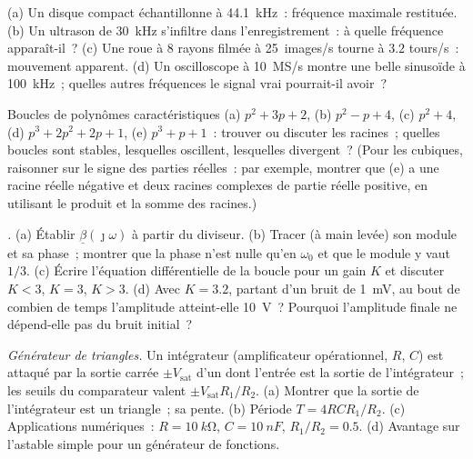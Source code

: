 \begin{exercise}[$\star$]\label{exo:b2:feedback-oscillators:4}
(a) Un disque compact échantillonne à \qty{44.1}{kHz}~: fréquence maximale restituée. (b) Un
ultrason de \qty{30}{kHz} s'infiltre dans l'enregistrement~: à quelle fréquence
apparaît-il~? (c) Une roue à $8$ rayons filmée à \qty{25}{images/s} tourne
à $3.2$ tours/s~: mouvement apparent. (d) Un oscilloscope à \qty{10}{MS/s}
montre une belle sinusoïde à \qty{100}{kHz}~; quelles autres fréquences le signal
vrai pourrait-il avoir~?
\end{exercise}

\begin{exercise}[$\star\star$]\label{exo:b2:feedback-oscillators:5}
Boucles de polynômes caractéristiques (a) $p^2 + 3p + 2$, (b) $p^2 - p +
4$, (c) $p^2 + 4$, (d) $p^3 + 2p^2 + 2p + 1$, (e) $p^3 + p + 1$~: trouver ou
discuter les racines~; quelles boucles sont stables, lesquelles oscillent, lesquelles divergent~?
(Pour les cubiques, raisonner sur le signe des parties réelles~: par exemple, montrer que (e)
a une racine réelle négative et deux racines complexes de partie réelle
positive, en utilisant le produit et la somme des racines.)
\end{exercise}

\begin{exercise}[$\star\star$]\label{exo:b2:feedback-oscillators:6}
\emph{.} (a) Établir $\underline\beta(\jmath\omega)$ à partir du diviseur.
(b) Tracer (à main levée) son module et sa phase~; montrer que la phase n'est nulle qu'en
$\omega_0$ et que le module y vaut $1/3$. (c) Écrire l'équation différentielle
de la boucle pour un gain $K$ et discuter $K < 3$, $K = 3$, $K > 3$.
(d) Avec $K = 3.2$, partant d'un bruit de \qty{1}{mV}, au bout de combien de temps
l'amplitude atteint-elle \qty{10}{V}~? Pourquoi l'amplitude finale ne dépend-elle pas du
bruit initial~?
\end{exercise}

\begin{exercise}[$\star\star$]\label{exo:b2:feedback-oscillators:7}
\emph{Générateur de triangles.} Un intégrateur (amplificateur opérationnel, $R$, $C$) est attaqué par
la sortie carrée $\pm V_{\text{sat}}$ d'un  dont l'entrée
est la sortie de l'intégrateur~; les seuils du comparateur valent
$\pm V_{\text{sat}}R_1/R_2$. (a) Montrer que la sortie de l'intégrateur est un triangle~;
sa pente. (b) Période $T = 4RCR_1/R_2$. (c) Applications numériques~: $R = \qty{10}{k\ohm}$,
$C = \qty{10}{nF}$, $R_1/R_2 = 0.5$. (d) Avantage sur l'astable simple
pour un générateur de fonctions.
\end{exercise}

